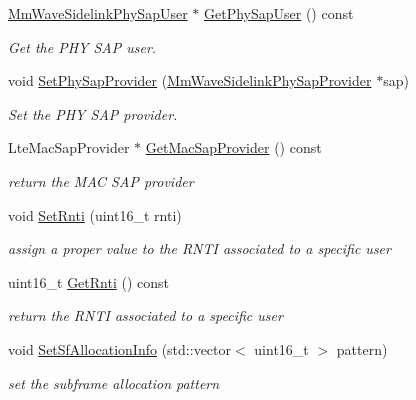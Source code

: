 \begin{DoxyCompactItemize}
\hyperlink{classns3_1_1millicar_1_1MmWaveSidelinkPhySapUser}{Mm\+Wave\+Sidelink\+Phy\+Sap\+User} $\ast$ \hyperlink{classns3_1_1millicar_1_1MmWaveSidelinkMac_ae6a8f2b11ed7ac5d33dc0629937695e6}{Get\+Phy\+Sap\+User} () const
\begin{DoxyCompactList}\small\item\em Get the P\+HY S\+AP user. \end{DoxyCompactList}\item 
void \hyperlink{classns3_1_1millicar_1_1MmWaveSidelinkMac_a42acefcfc918c3500669e32e40bf42a0}{Set\+Phy\+Sap\+Provider} (\hyperlink{classns3_1_1millicar_1_1MmWaveSidelinkPhySapProvider}{Mm\+Wave\+Sidelink\+Phy\+Sap\+Provider} $\ast$sap)
\begin{DoxyCompactList}\small\item\em Set the P\+HY S\+AP provider. \end{DoxyCompactList}\item 
Lte\+Mac\+Sap\+Provider $\ast$ \hyperlink{classns3_1_1millicar_1_1MmWaveSidelinkMac_a9ac166a4e4d5e2449cb0e69a165719cb}{Get\+Mac\+Sap\+Provider} () const
\begin{DoxyCompactList}\small\item\em return the M\+AC S\+AP provider \end{DoxyCompactList}\item 
void \hyperlink{classns3_1_1millicar_1_1MmWaveSidelinkMac_af1686c0688c1bafeccb463ea2bc6f828}{Set\+Rnti} (uint16\+\_\+t rnti)
\begin{DoxyCompactList}\small\item\em assign a proper value to the R\+N\+TI associated to a specific user \end{DoxyCompactList}\item 
uint16\+\_\+t \hyperlink{classns3_1_1millicar_1_1MmWaveSidelinkMac_a229809ca241dc9416dfb8ec82d8e48f6}{Get\+Rnti} () const
\begin{DoxyCompactList}\small\item\em return the R\+N\+TI associated to a specific user \end{DoxyCompactList}\item 
void \hyperlink{classns3_1_1millicar_1_1MmWaveSidelinkMac_a3862171847195f4cf9122fb8f05ed3eb}{Set\+Sf\+Allocation\+Info} (std\+::vector$<$ uint16\+\_\+t $>$ pattern)
\begin{DoxyCompactList}\small\item\em set the subframe allocation pattern \end{DoxyCompactList}\item 

\end{DoxyCompactItemize}
